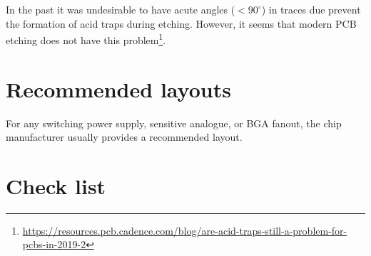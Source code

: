 In the past it was undesirable to have acute angles ($<90^{\circ}$) in
traces due prevent the formation of acid traps during etching.
However, it seems that modern PCB etching does not have this
problem\footnote{\url{https://resources.pcb.cadence.com/blog/are-acid-traps-still-a-problem-for-pcbs-in-2019-2}}.


\section{Recommended layouts}

For any switching power supply, sensitive analogue, or BGA fanout, the
chip manufacturer usually provides a recommended layout.

\section{Check list}
\label{PCB-check-list}

